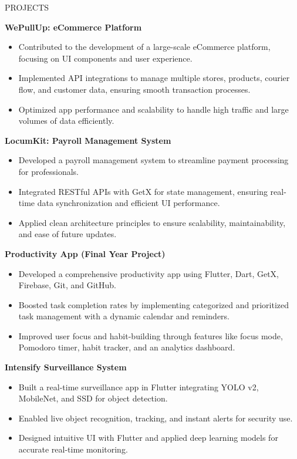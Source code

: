 \documentclass{resume}
\begin{document}
\begin{rSection}{PROJECTS}

\textbf{WePullUp: eCommerce Platform} \hfill {}
\begin{itemize}
\item Contributed to the development of a large-scale eCommerce platform, focusing on UI components and user experience.
\item Implemented API integrations to manage multiple stores, products, courier flow, and customer data, ensuring smooth transaction processes.
\item Optimized app performance and scalability to handle high traffic and large volumes of data efficiently.
\end{itemize}

\textbf{LocumKit: Payroll Management System} \hfill {}
\begin{itemize}
\item Developed a payroll management system to streamline payment processing for professionals.
\item Integrated RESTful APIs with GetX for state management, ensuring real-time data synchronization and efficient UI performance.
\item Applied clean architecture principles to ensure scalability, maintainability, and ease of future updates.
\end{itemize}

\textbf{Productivity App (Final Year Project)} \hfill {}
\begin{itemize}
\item Developed a comprehensive productivity app using Flutter, Dart, GetX, Firebase, Git, and GitHub.
\item Boosted task completion rates by implementing categorized and prioritized task management with a dynamic calendar and reminders.
\item Improved user focus and habit-building through features like focus mode, Pomodoro timer, habit tracker, and an analytics dashboard.
\end{itemize}

\textbf{Intensify Surveillance System} \hfill {}
\begin{itemize}
\item Built a real-time surveillance app in Flutter integrating YOLO v2, MobileNet, and SSD for object detection.
\item Enabled live object recognition, tracking, and instant alerts for security use.
\item Designed intuitive UI with Flutter and applied deep learning models for accurate real-time monitoring.
\end{itemize}


\end{rSection}
\end{document}
